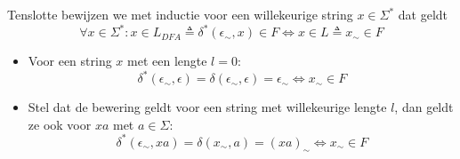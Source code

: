 \begin{itemize}
  Tenslotte bewijzen we met inductie voor een willekeurige string $x \in \Sigma^*$ dat geldt
  \begin{equation*}
  \forall x \in \Sigma^*: x \in L_{DFA} \triangleq \delta^*(\epsilon_\sim,x) \in F \Leftrightarrow x \in L \triangleq x_\sim \in F
  \end{equation*}
  \begin{itemize}
  \item Voor een string $x$ met een lengte $l = 0$:
  \begin{equation*}
  \delta^*(\epsilon_\sim,\epsilon) = \delta(\epsilon_\sim,\epsilon) = \epsilon_\sim \Leftrightarrow x_\sim \in F
  \end{equation*}
  \item Stel dat de bewering geldt voor een string met willekeurige lengte $l$, dan geldt ze ook voor $xa$ met $a \in \Sigma$:
  \begin{equation*}
  \delta^*(\epsilon_\sim,xa) = \delta(x_\sim,a) = (xa)_\sim \Leftrightarrow x_\sim \in F
  \end{equation*}
  \end{itemize}
  \end{itemize}
